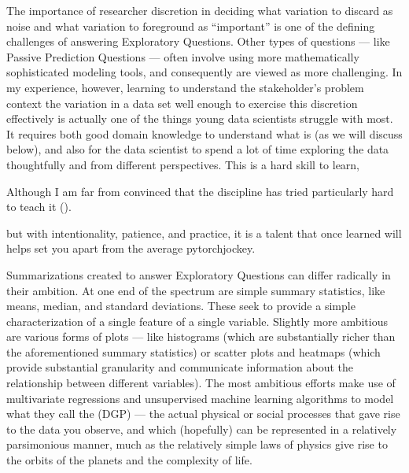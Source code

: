 \documentclass[letterpaper,10pt,english]{jupyterBook}
\begin{document}
\sphinxAtStartPar
The importance of researcher discretion in deciding what variation to discard as noise and what variation to foreground as “important” is one of the defining challenges of answering Exploratory Questions. Other types of questions — like Passive Prediction Questions — often involve using more mathematically sophisticated modeling tools, and consequently are viewed as more challenging. In my experience, however, learning to understand the stakeholder’s problem context  the variation in a data set well enough to exercise this discretion effectively is actually one of the things young data scientists struggle with most. It requires both good domain knowledge to understand what is  (as we will discuss below), and also for the data scientist to spend a lot of time exploring the data thoughtfully and from different perspectives. This is a hard skill to learn,%
\begin{footnote}[1]\sphinxAtStartFootnote
Although I am far from convinced that the discipline has tried particularly hard to teach it ({\hyperref[\detokenize{30_questions/15_answering_exploratory_questions:07_eda.ipynb}]{}}).
%
\end{footnote} but with intentionality, patience, and practice, it is a talent that once learned will helps set you apart from the average pytorch\sphinxhyphen{}jockey.

\sphinxAtStartPar
Summarizations created to answer Exploratory Questions can differ radically in their ambition. At one end of the spectrum are simple summary statistics, like means, median, and standard deviations. These seek to provide a simple characterization of a single feature of a single variable. Slightly more ambitious are various forms of plots — like histograms (which are substantially richer than the aforementioned summary statistics) or scatter plots and heatmaps (which provide substantial granularity and communicate information about the relationship between different variables). The most ambitious efforts make use of multivariate regressions and unsupervised machine learning algorithms to model what they call the  (DGP) — the actual physical or social processes that gave rise to the data you observe, and which (hopefully) can be represented in a relatively parsimonious manner, much as the relatively simple laws of physics give rise to the orbits of the planets and the complexity of life.
\end{document}
